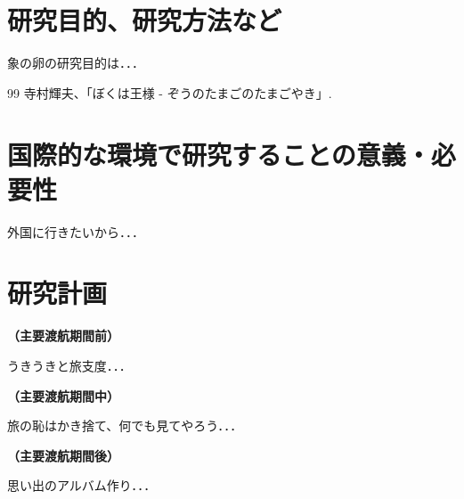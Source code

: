 \documentclass[11pt,a4j,dvipdfmx]{jarticle} 					%
\newcommand{\研究課題名}{象の卵}
\newcommand{\研究機関名}{逢坂大学}
\newcommand{\研究代表者氏名}{湯川秀樹}
\begin{document}

\section{研究目的、研究方法など}

	 象の卵の研究目的は．．．

	\vspace{1cm}
	\begin{thebibliography}{99}
		 寺村輝夫、「ぼくは王様 - ぞうのたまごのたまごやき」.
	\end{thebibliography}



\section{国際的な環境で研究することの意義・必要性}

	外国に行きたいから．．．




\section{研究計画}

\noindent
\mbox{\textbf{（主要渡航期間前）}}

	うきうきと旅支度．．．

\noindent
\mbox{\textbf{（主要渡航期間中）}}

	旅の恥はかき捨て、何でも見てやろう．．．

\noindent
\mbox{\textbf{（主要渡航期間後）}}

	思い出のアルバム作り．．．


\end{document}
